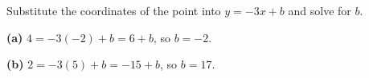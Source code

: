 Substitute the coordinates of the point into $y=-3x+b$ and solve for $b$.

\textbf{(a)} $4=-3(-2)+b=6+b$, so $\boxed{b=-2}$.

\textbf{(b)} $2=-3(5)+b=-15+b$, so $\boxed{b=17}$.
